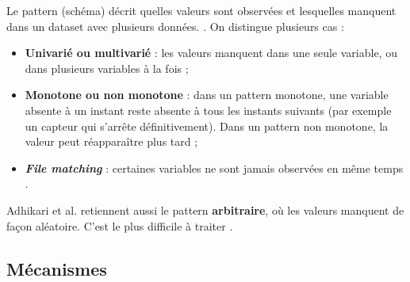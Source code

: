 Le pattern (schéma) décrit quelles valeurs sont observées et lesquelles manquent dans un dataset avec plusieurs données. \cite{Zahmatkesh_2026}. 
On distingue plusieurs cas :
\begin{itemize}
    \item \textbf{Univarié ou multivarié} : les valeurs manquent dans une seule variable, ou dans plusieurs variables à la fois \cite{Zahmatkesh_2026} ;
    \item \textbf{Monotone ou non monotone} : dans un pattern monotone, une variable absente à un instant reste absente à tous les instants suivants (par exemple un capteur qui s’arrête définitivement). Dans un pattern non monotone, la valeur peut réapparaître plus tard \cite{Zahmatkesh_2026} ;
    \item \textbf{\emph{File matching}} : certaines variables ne sont jamais observées en même temps \cite{Zahmatkesh_2026}.
\end{itemize}
Adhikari et al. retiennent aussi le pattern \textbf{arbitraire}, où les valeurs manquent de façon aléatoire. C’est le plus difficile à traiter \cite{Adhikari_2023}.

\subsection{Mécanismes}

